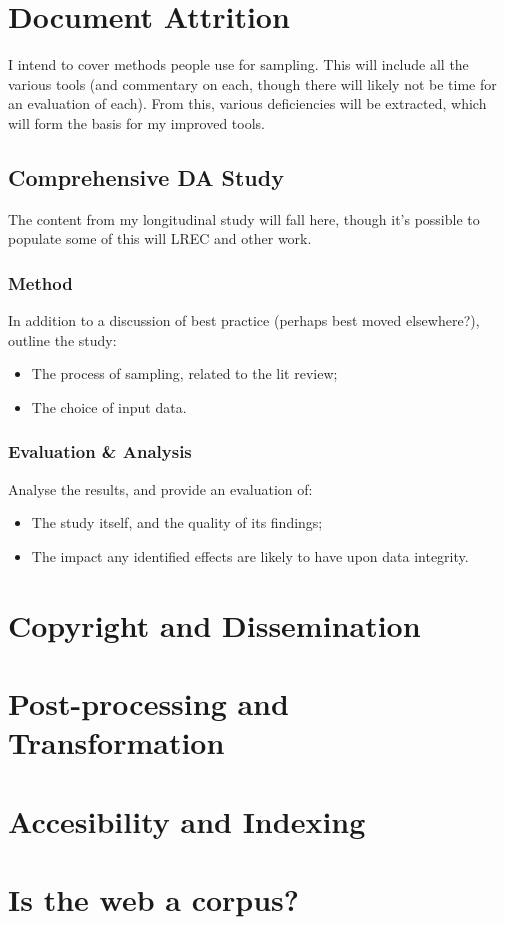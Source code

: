 
\section{Document Attrition}
I intend to cover methods people use for sampling.  This will include all the various tools (and commentary on each, though there will likely not be time for an evaluation of each).  From this, various deficiencies will be extracted, which will form the basis for my improved tools.




\subsection{Comprehensive DA Study}
The content from my longitudinal study will fall here, though it's possible to populate some of this will LREC and other work.

\subsubsection{Method}
In addition to a discussion of best practice (perhaps best moved elsewhere?), outline the study:
\begin{itemize}
	\item The process of sampling, related to the lit review;
	\item The choice of input data.
\end{itemize}


\subsubsection{Evaluation \& Analysis}
Analyse the results, and provide an evaluation of:
\begin{itemize}
	\item The study itself, and the quality of its findings;
	\item The impact any identified effects are likely to have upon data integrity.
\end{itemize}


\section{Copyright and Dissemination}
\section{Post-processing and Transformation}
\section{Accesibility and Indexing}
\section{Is the web a corpus?}
